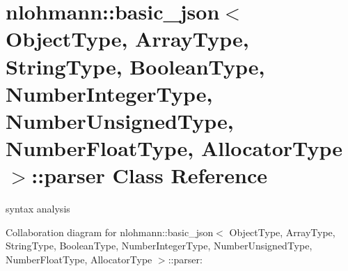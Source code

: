 \hypertarget{classnlohmann_1_1basic__json_1_1parser}{}\section{nlohmann\+:\+:basic\+\_\+json$<$ Object\+Type, Array\+Type, String\+Type, Boolean\+Type, Number\+Integer\+Type, Number\+Unsigned\+Type, Number\+Float\+Type, Allocator\+Type $>$\+:\+:parser Class Reference}
\label{classnlohmann_1_1basic__json_1_1parser}


syntax analysis  




Collaboration diagram for nlohmann\+:\+:basic\+\_\+json$<$ Object\+Type, Array\+Type, String\+Type, Boolean\+Type, Number\+Integer\+Type, Number\+Unsigned\+Type, Number\+Float\+Type, Allocator\+Type $>$\+:\+:parser\+:
